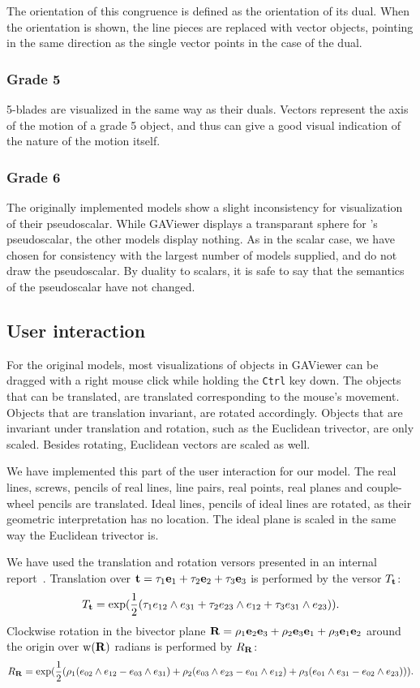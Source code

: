 The orientation of this congruence is defined as the orientation of its dual.  When the orientation is shown, the line pieces are replaced with vector objects, pointing in the same direction as the single vector points in the case of the dual.

\subsubsection{Grade 5}
5-blades are visualized in the same way as their duals.  Vectors represent the axis of the motion of a grade 5 object, and thus can give a good visual indication of the nature of the motion itself.

\subsubsection{Grade 6}
The originally implemented models show a slight inconsistency for visualization of their pseudoscalar.  While GAViewer displays a transparant sphere for \ega{}'s pseudoscalar, the other models display nothing.  As in the scalar case, we have chosen for consistency with the largest number of models supplied, and do not draw the pseudoscalar.  By duality to scalars, it is safe to say that the semantics of the pseudoscalar have not changed.

\subsection{User interaction}
For the original models, most visualizations of objects in GAViewer can be dragged with a right mouse click while holding the \texttt{Ctrl} key down.  The objects that can be translated, are translated corresponding to the mouse's movement.  Objects that are translation invariant, are rotated accordingly.  Objects that are invariant under translation and rotation, such as the Euclidean trivector, are only scaled.  Besides rotating, Euclidean vectors are scaled as well.

We have implemented this part of the user interaction for our model.  The real lines, screws, pencils of real lines, line pairs, real points, real planes and couple-wheel pencils are translated.  Ideal lines, pencils of ideal lines are rotated, as their geometric interpretation has no location.  The ideal plane is scaled in the same way the Euclidean trivector is.  

We have used the translation and rotation versors presented in an internal report~\cite{internal}.  Translation over $\mathbf{t} = \tau_1\mathbf{e}_1 + \tau_2\mathbf{e}_2 + \tau_3\mathbf{e}_3$ is performed by the versor $T_{\mathbf{t}}$: 
\begin{equation*}
  T_{\mathbf{t}} = \exp(\frac{1}{2} (\tau_1 e_{12} \wedge e_{31} + \tau_2 e_{23} \wedge e_{12} + \tau_3 e_{31} \wedge e_{23})) . 
\end{equation*}
Clockwise rotation in the bivector plane $\mathbf{R} = \rho_1 \mathbf{e}_2\mathbf{e}_3 + \rho_2\mathbf{e}_3\mathbf{e}_1 + \rho_3\mathbf{e}_1\mathbf{e}_2$ around the origin over $\operatorname{w}(\mathbf{R})$ radians is performed by $R_{\mathbf{R}}$:
\begin{equation*}
  R_{\mathbf{R}} = \exp(\frac{1}{2} (\rho_1 (e_{02} \wedge e_{12} - e_{03} \wedge e_{31}) + \rho_2 (e_{03} \wedge e_{23} - e_{01} \wedge e_{12}) + \rho_3 (e_{01} \wedge e_{31} - e_{02} \wedge e_{23}))) .
\end{equation*}
